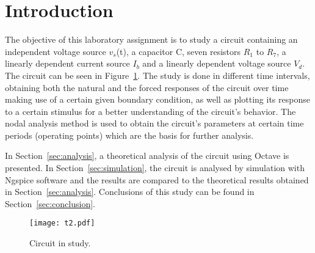 \section{Introduction}
\label{sec:introduction}

The objective of this laboratory assignment is to study a circuit containing an
independent voltage source $v_s$(t), a capacitor C, seven resistors $R_1$ to $R_7$, a linearly dependent current source $I_b$ and a linearly dependent voltage source $V_d$.
The circuit can be seen in Figure~\ref{fig:t2}. The study is done in different time intervals, obtaining both the natural and the forced responses of the circuit over time making use of a certain given boundary condition, as well as plotting its response to a certain stimulus for a better understanding of the circuit's behavior. The nodal analysis method is used to obtain the circuit's parameters at certain time periods (operating points) which are the basis for further analysis. \par


In Section~\ref{sec:analysis}, a theoretical analysis of the circuit using Octave is
presented. In Section~\ref{sec:simulation}, the circuit is analysed by
simulation with Ngspice software and the results are compared to the theoretical results obtained in Section~\ref{sec:analysis}. Conclusions of this study can be found in
Section~\ref{sec:conclusion}.

\begin{figure}[htp] \centering
\texttt{[image: t2.pdf]}
\caption{Circuit in study.}
\label{fig:t2}
\end{figure}
\FloatBarrier

